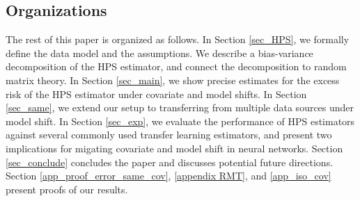 



\subsection{Organizations}
The rest of this paper is organized as follows.
In Section \ref{sec_HPS}, we formally define the data model and the assumptions.
We describe a bias-variance decomposition of the HPS estimator, and connect the decomposition to random matrix theory.
In Section \ref{sec_main}, we show precise estimates for the excess risk of the HPS estimator under covariate and model shifts.
In Section \ref{sec_same}, we extend our setup to transferring from multiple data sources under model shift.
In Section \ref{sec_exp}, we evaluate the performance of HPS estimators against several commonly used transfer learning estimators, and present two implications for migating covariate and model shift in neural networks.
Section \ref{sec_conclude} concludes the paper and discusses potential future directions.
Section \ref{app_proof_error_same_cov}, \ref{appendix RMT}, and \ref{app_iso_cov} present proofs of our results.